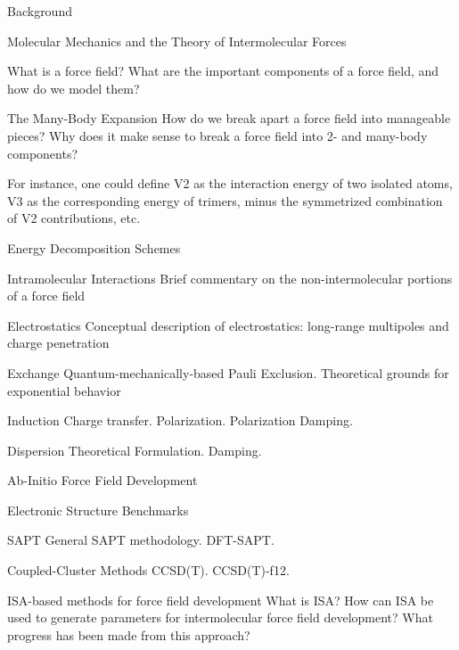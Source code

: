\begin{chapter}{Background}
\label{ch:background}



\begin{section}{Molecular Mechanics and the Theory of Intermolecular Forces}

What is a force field?
What are the important components of a force field, and how do we model them?
%
\begin{subsection}{The Many-Body Expansion}
How do we break apart a force field into manageable pieces? Why does it make
sense to break a force field into 2- and many-body components?

For instance, one could define V2 as the interaction energy of two isolated
atoms, V3 as the corresponding energy of trimers, minus the symmetrized
combination of V2 contributions, etc.

\end{subsection}
\begin{subsection}{Energy Decomposition Schemes}
\begin{subsubsection}{Intramolecular Interactions}
Brief commentary on the non-intermolecular portions of a force field
\end{subsubsection}
\begin{subsubsection}{Electrostatics}
Conceptual description of electrostatics: long-range multipoles and charge
penetration
\end{subsubsection}
\begin{subsubsection}{Exchange}
Quantum-mechanically-based Pauli Exclusion.
Theoretical grounds for exponential behavior
\end{subsubsection}
\begin{subsubsection}{Induction}
Charge transfer.
Polarization.
Polarization Damping.
\end{subsubsection}
\begin{subsubsection}{Dispersion}
Theoretical Formulation.
Damping.
\end{subsubsection}
\end{subsection}
%
\end{section}


\begin{section}{Ab-Initio Force Field Development}
\begin{subsection}{Electronic Structure Benchmarks}
\begin{subsubsection}{SAPT}
General SAPT methodology.
DFT-SAPT.
\end{subsubsection}
\begin{subsubsection}{Coupled-Cluster Methods}
CCSD(T).
CCSD(T)-f12.
\end{subsubsection}
\end{subsection}
\end{section}


\begin{section}{ISA-based methods for force field development}
What is ISA? How can ISA be used to generate parameters for intermolecular
force field development? What progress has been made from this approach?
\end{section}



\end{chapter}
